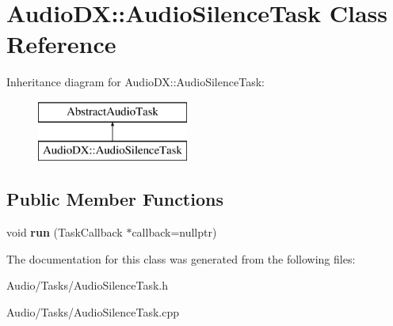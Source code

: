 \hypertarget{class_audio_d_x_1_1_audio_silence_task}{\section{Audio\-D\-X\-:\-:Audio\-Silence\-Task Class Reference}
\label{class_audio_d_x_1_1_audio_silence_task}
}
Inheritance diagram for Audio\-D\-X\-:\-:Audio\-Silence\-Task\-:\begin{figure}[H]
\begin{center}
\leavevmode
\includegraphics[height=2.000000cm]{class_audio_d_x_1_1_audio_silence_task}
\end{center}
\end{figure}
\subsection*{Public Member Functions}
\begin{DoxyCompactItemize}
\item 
\hypertarget{class_audio_d_x_1_1_audio_silence_task_aed116ef02340c7770cd44203d0ef07f6}{void {\bfseries run} (Task\-Callback $\ast$callback=nullptr)}\label{class_audio_d_x_1_1_audio_silence_task_aed116ef02340c7770cd44203d0ef07f6}

\end{DoxyCompactItemize}


The documentation for this class was generated from the following files\-:\begin{DoxyCompactItemize}
\item 
Audio/\-Tasks/Audio\-Silence\-Task.\-h\item 
Audio/\-Tasks/Audio\-Silence\-Task.\-cpp\end{DoxyCompactItemize}

